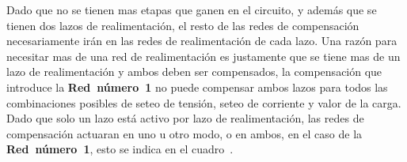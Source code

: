 Dado que no se tienen mas etapas que ganen en el circuito, y además que se tienen dos lazos de realimentación, el resto de las redes de compensación necesariamente irán en las redes de realimentación de cada lazo. Una razón para necesitar mas de una red de realimentación es justamente que se tiene mas de un lazo de realimentación y ambos deben ser compensados, la compensación que introduce la \textbf{Red~número~1} no puede compensar ambos lazos para todos las combinaciones posibles de seteo de tensión, seteo de corriente y valor de la carga. Dado que solo un lazo está activo por lazo de realimentación, las redes de compensación actuaran en uno u otro modo, o en ambos, en el caso de la \textbf{Red~número~1}, esto se indica en el cuadro~.





%
%
%
%
%
%
%
%
%
%


